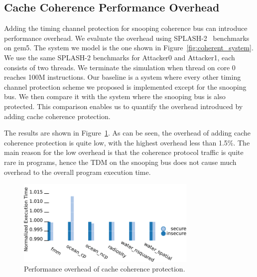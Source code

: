\subsection{Cache Coherence Performance Overhead}

Adding the timing channel protection for snooping coherence bus can introduce 
performance overhead. We evaluate the overhead using SPLASH-2~\cite{splash2} benchmarks on 
gem5. The system we model is the one shown in Figure~\ref{fig:coherent_system}.
We use the same SPLASH-2 benchmarks for Attacker0 and Attacker1, each consists 
of two threads. We terminate the simulation
when thread on core 0 reaches 100M instructions.  Our baseline is a system 
where every other timing channel protection scheme we proposed is implemented 
except for the snooping bus.
We then compare it with the system where the snooping bus is also protected. 
This comparison enables us to quantify the overhead introduced by adding 
cache coherence protection. 

The results are shown in Figure~\ref{fig:splash2}. As can be seen, the overhead 
of adding cache coherence protection is
quite low, with the highest overhead less than 1.5\%. 
The main reason for the low overhead is that the coherence protocol traffic 
is quite rare in programs, hence the TDM on the
snooping bus does not cause much overhead to the overall program execution 
time.

\begin{figure}
    \begin{center}
        \includegraphics[width=3.4in]{figs/SPLASH.pdf}
        \caption{Performance overhead of cache coherence protection.}
        \label{fig:splash2}
		\vspace{-0.2in}
    \end{center}
\end{figure}
